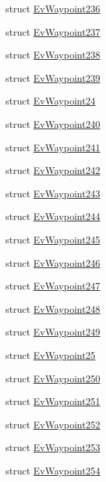 \begin{DoxyCompactItemize}
struct \hyperlink{structmove__base__z__client_1_1EvWaypoint236}{Ev\+Waypoint236}
\item 
struct \hyperlink{structmove__base__z__client_1_1EvWaypoint237}{Ev\+Waypoint237}
\item 
struct \hyperlink{structmove__base__z__client_1_1EvWaypoint238}{Ev\+Waypoint238}
\item 
struct \hyperlink{structmove__base__z__client_1_1EvWaypoint239}{Ev\+Waypoint239}
\item 
struct \hyperlink{structmove__base__z__client_1_1EvWaypoint24}{Ev\+Waypoint24}
\item 
struct \hyperlink{structmove__base__z__client_1_1EvWaypoint240}{Ev\+Waypoint240}
\item 
struct \hyperlink{structmove__base__z__client_1_1EvWaypoint241}{Ev\+Waypoint241}
\item 
struct \hyperlink{structmove__base__z__client_1_1EvWaypoint242}{Ev\+Waypoint242}
\item 
struct \hyperlink{structmove__base__z__client_1_1EvWaypoint243}{Ev\+Waypoint243}
\item 
struct \hyperlink{structmove__base__z__client_1_1EvWaypoint244}{Ev\+Waypoint244}
\item 
struct \hyperlink{structmove__base__z__client_1_1EvWaypoint245}{Ev\+Waypoint245}
\item 
struct \hyperlink{structmove__base__z__client_1_1EvWaypoint246}{Ev\+Waypoint246}
\item 
struct \hyperlink{structmove__base__z__client_1_1EvWaypoint247}{Ev\+Waypoint247}
\item 
struct \hyperlink{structmove__base__z__client_1_1EvWaypoint248}{Ev\+Waypoint248}
\item 
struct \hyperlink{structmove__base__z__client_1_1EvWaypoint249}{Ev\+Waypoint249}
\item 
struct \hyperlink{structmove__base__z__client_1_1EvWaypoint25}{Ev\+Waypoint25}
\item 
struct \hyperlink{structmove__base__z__client_1_1EvWaypoint250}{Ev\+Waypoint250}
\item 
struct \hyperlink{structmove__base__z__client_1_1EvWaypoint251}{Ev\+Waypoint251}
\item 
struct \hyperlink{structmove__base__z__client_1_1EvWaypoint252}{Ev\+Waypoint252}
\item 
struct \hyperlink{structmove__base__z__client_1_1EvWaypoint253}{Ev\+Waypoint253}
\item 
struct \hyperlink{structmove__base__z__client_1_1EvWaypoint254}{Ev\+Waypoint254}

\end{DoxyCompactItemize}
